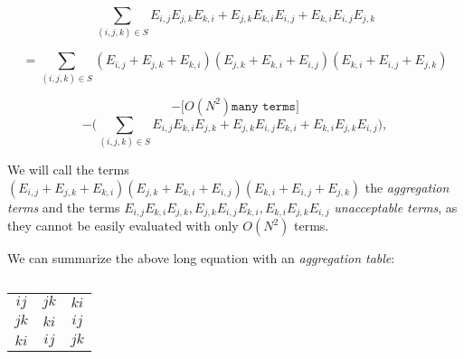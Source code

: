 \documentclass{article}
\begin{document}
\[\sum_{(i,j,k)\in S}E_{i,j}E_{j,k}E_{k,i}+E_{j,k}E_{k,i}E_{i,j}+E_{k,i}E_{i,j}E_{j,k}\]
\begin{comment}
\[=\sum_{(i,j,k)\in S}\Big[(E_{i,j}+E_{j,k}+E_{k,i})(E_{j,k}+E_{k,i}+E_{i,j})(E_{k,i}+E_{i,j}+E_{j,k})\]
\[-E_{i,j}E_{i,j}(E_{k,i}+E_{i,j}+E_{j,k})-E_{j,k}E_{j,k}(E_{k,i}+E_{i,j}+E_{j,k})-E_{k,i}E_{k,i}(E_{k,i}+E_{i,j}+E_{j,k})\]
\[-E_{i,j}(E_{j,k}+E_{k,i}E_{i,j}-E_{j,k}(E_{i,j}+E_{k,i})E_{j,k}-E_{k,i}(E_{i,j}+E_{j,k})E_{k,i}\]
\[-(E_{j,k}+E_{k,i})E_{i,j}E_{i,j}-(E_{i,j}+E_{k,i})E_{j,k}E_{j,k}-(E_{i,j}+E_{j,k})E_{k,i}E_{k,i}\]
\[-E_{i,j}E_{k,i}E_{j,k}-E_{j,k}E_{i,j}E_{k,i}-E_{k,i}E_{j,k}E_{i,j}\Big]\]
\end{comment}

\[=\sum_{(i,j,k)\in S}(E_{i,j}+E_{j,k}+E_{k,i})(E_{j,k}+E_{k,i}+E_{i,j})(E_{k,i}+E_{i,j}+E_{j,k})\]
\begin{comment}
\[-\sum_{(i,j)\in S_{IJ}}E_{i,j}E_{i,j}(\sum_k^*E_{k,i}+E_{i,j}+E_{j,k})\]
\[-\sum_{(j,k)\in S_{JK}}E_{j,k}E_{j,k}(\sum_i^*E_{k,i}+E_{i,j}+E_{j,k})\]
\[-\sum_{(k,i)\in S_{KI}}E_{k,i}E_{k,i}(\sum_j^*E_{k,i}+E_{i,j}+E_{j,k})\]
\[-\sum_{(i,j)\in S_{IJ}}E_{i,j}(\sum_k^*E_{j,k}+E_{k,i})E_{i,j}\]
\[-\sum_{(j,k)\in S_{JK}}E_{j,k}(\sum_i^*E_{i,j}+E_{k,i})E_{j,k}\]
\[-\sum_{(k,i)\in S_{KI}}E_{k,i}(\sum_j^*E_{i,j}+E_{j,k})E_{k,i}\]
\[-\sum_{(i,j)\in S_{IJ}}(\sum_k^*E_{j,k}+E_{k,i})E_{i,j}E_{i,j}\]
\[-\sum_{(j,k)\in S_{JK}}(\sum_i^*E_{i,j}+E_{k,i})E_{j,k}E_{j,k}\]
\[-\sum_{(k,i)\in S_{KI}}(\sum_j^*E_{i,j}+E_{j,k})E_{k,i}E_{k,i}\]
\end{comment}
\[-\Big[ O(N^2) \texttt{many terms}\Big]\]
\[-\Big(\sum_{(i,j,k)\in S}E_{i,j}E_{k,i}E_{j,k}+E_{j,k}E_{i,j}E_{k,i}+E_{k,i}E_{j,k}E_{i,j}\Big),\]

\begin{comment}
where $\sum_i^*,\sum_j^*,\sum_K^*$ are short for $\sum_{i|(i,j,k)\in S},\sum_{j|(i,j,k)\in S},\sum_{k|(i,j,k)\in S}$ respectively. 
\end{comment}

We will call the terms $(E_{i,j}+E_{j,k}+E_{k,i})(E_{j,k}+E_{k,i}+E_{i,j})(E_{k,i}+E_{i,j}+E_{j,k})$ the \textit{aggregation terms} and the terms $E_{i,j}E_{k,i}E_{j,k}, E_{j,k}E_{i,j}E_{k,i}, E_{k,i}E_{j,k}E_{i,j}$ \textit{unacceptable terms}, as they cannot be easily evaluated with only $O(N^2)$ terms.

We can summarize the above long equation with an \textit{aggregation table}:

\begin{table}[H]
    \centering
    \begin{tabular}{c|c|c}
        $ij$ & $jk$ & $ki$ \\
        $jk$ & $ki$ & $ij$ \\
        $ki$ & $ij$ & $jk$ \\
    \end{tabular}
    \label{group1}
    \caption{}
\end{table}
\end{document}
